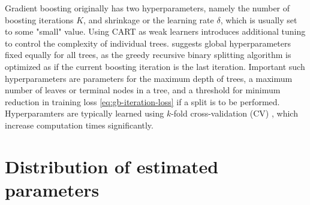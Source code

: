 Gradient boosting originally has two hyperparameters, namely the number of boosting iterations $K$, and shrinkage or the learning rate $\delta$, which is usually set to some "small" value.
Using CART as weak learners introduces additional tuning to control the complexity of individual trees.
\citet{friedman2000additive} suggests global hyperparameters fixed equally for all trees, as the greedy recursive binary splitting algorithm is optimized as if the current boosting iteration is the last iteration.
Important such hyperparameters are parameters for the maximum depth of trees, a maximum number of leaves or terminal nodes in a tree, and a threshold for minimum reduction in training loss \eqref{eq:gb-iteration-loss} if a split is to be performed.
Hyperparamters are typically learned using $k$-fold cross-validation (CV) \citep{stone1974cross}, which increase computation times significantly.





%
%
%
%
%
%
%
%
%
%
%
%


\section{Distribution of estimated parameters}
\label{sec:distribution of estimated parameters}

